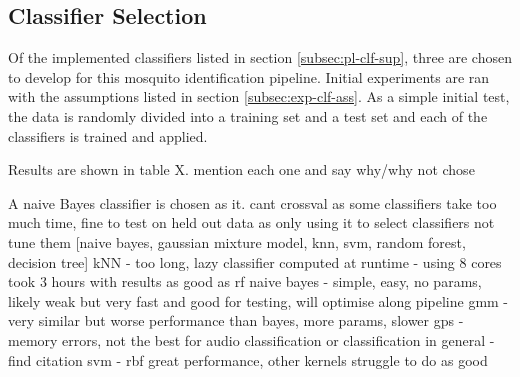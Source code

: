      
     
    \subsection{Classifier Selection}
    \label{subsec:exp-clf-select}
        Of the implemented classifiers listed in section \ref{subsec:pl-clf-sup}, three are chosen to develop for this mosquito identification pipeline. Initial experiments are ran with the assumptions listed in section \ref{subsec:exp-clf-ass}. As a simple initial test, the data is randomly divided into a training set and a test set and each of the classifiers is trained and applied.
        
        Results are shown in table X. mention each one and say why/why not chose
        
        
        A naive Bayes classifier is chosen as it. cant crossval as some classifiers take too much time, fine to test on held out data as only using it to select classifiers not tune them
        [naive bayes, gaussian mixture model, knn, svm, random forest, decision tree]
        kNN - too long, lazy classifier computed at runtime - using 8 cores took 3 hours with results as good as rf
        naive bayes - simple, easy, no params, likely weak but very fast and good for testing, will optimise along pipeline
        gmm - very similar but worse performance than bayes, more params, slower %
        gps - memory errors, not the best for audio classification or classification in general - find citation
        svm - rbf great performance, other kernels struggle to do as good
       
